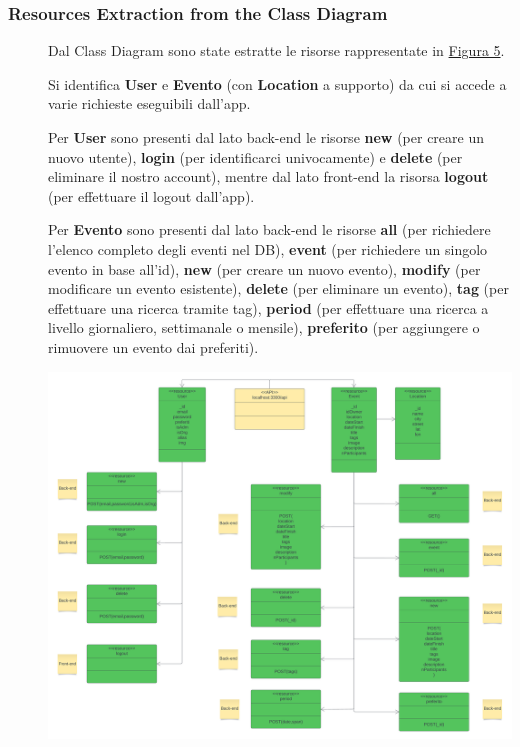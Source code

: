 \documentclass{article}
\begin{document}
\subsubsection{Resources Extraction from the Class Diagram}
\begin{description}
    \item[] Dal Class Diagram sono state estratte le risorse rappresentate in \hyperref[img:5]{Figura 5}.
    \item[] Si identifica \textbf{User} e \textbf{Evento} (con \textbf{Location} a supporto) da cui si accede a varie richieste eseguibili dall'app.
    \item[] Per \textbf{User} sono presenti dal lato back-end le risorse \textbf{new} (per creare un nuovo utente), \textbf{login} (per identificarci univocamente) e \textbf{delete} (per eliminare il nostro account), mentre dal lato front-end la risorsa \textbf{logout} (per effettuare il logout dall'app).
    \item[] Per \textbf{Evento} sono presenti dal lato back-end le risorse \textbf{all} (per richiedere l'elenco completo degli eventi nel DB), \textbf{event} (per richiedere un singolo evento in base all'id), \textbf{new} (per creare un nuovo evento), \textbf{modify} (per modificare un evento esistente), \textbf{delete} (per eliminare un evento), \textbf{tag} (per effettuare una ricerca tramite tag), \textbf{period} (per effettuare una ricerca a livello giornaliero, settimanale o mensile), \textbf{preferito} (per aggiungere o rimuovere un evento dai preferiti).
    \item[] \label{img:5} \begin{center}
            \includegraphics[scale=0.4]{resources.png}
        \end{center}
\end{description}
\end{document}
